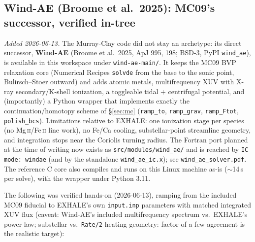 \documentclass[english,a4paper]{my_memo}
\begin{document}
\subsection{Wind-AE (Broome et al.\ 2025): MC09's successor, verified
in-tree}
\label{sec:windae}

\emph{Added 2026-06-13.} The Murray-Clay code did not stay an archetype:
its direct successor, \textbf{Wind-AE} (Broome et al.\ 2025, ApJ 995,
198; BSD-3, PyPI \texttt{wind\_ae}), is available in this workspace
under \texttt{wind-ae-main/}. It keeps the MC09 BVP relaxation core
(Numerical Recipes \texttt{solvde} from the base to the sonic point,
Bulirsch--Stoer outward) and adds atomic metals, multifrequency XUV with
X-ray secondary/K-shell ionization, a toggleable tidal $+$ centrifugal
potential, and (importantly) a Python wrapper that implements
exactly the continuation/homotopy scheme of \S\ref{sec:mc}
(\texttt{ramp\_to}, \texttt{ramp\_grav}, \texttt{ramp\_Ftot},
\texttt{polish\_bcs}). Limitations relative to EXHALE: one ionization
stage per species (no Mg\,\textsc{ii}/Fe\,\textsc{ii} line work), no
Fe/Ca cooling, substellar-point streamline geometry, and integration
stops near the Coriolis turning radius. The Fortran port planned at the time
of writing now exists as \texttt{src/modules/wind\_ae/} and is reached by
\texttt{IC mode: windae} (and by the standalone \texttt{wind\_ae\_ic.x}); see
\texttt{wind\_ae\_solver.pdf}. The reference C core also compiles and runs on
this Linux machine as-is ($\sim$14\,s per solve), with the wrapper under
Python 3.11.

The following was verified hands-on (2026-06-13), ramping from the
included MC09 fiducial to EXHALE's own \texttt{input.inp} parameters with
matched integrated XUV flux (caveat: Wind-AE's included multifrequency
spectrum vs.\ EXHALE's power law; substellar vs.\ \texttt{Rate/2}
heating geometry: factor-of-a-few agreement is the realistic target):
\end{document}
